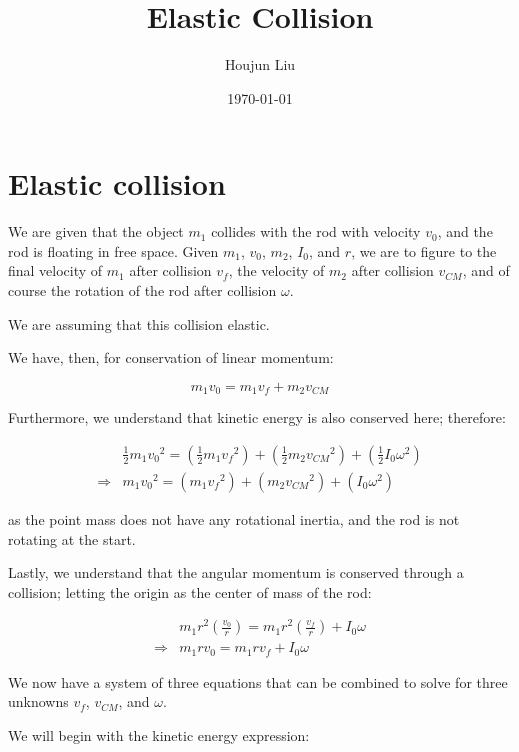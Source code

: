 \documentclass[letterpaper]{article}
\author{Houjun Liu}
\date{\today}
\title{Elastic Collision}
\renewcommand{\tableofcontents}{}
\renewcommand\maketitle{}
\begin{document}
\maketitle
\tableofcontents


\section{Elastic collision}
\label{sec:org0e469a7}
We are given that the object \(m_1\) collides with the rod with velocity \(v_0\), and the rod is floating in free space. Given \(m_1\), \(v_0\), \(m_2\), \(I_0\), and \(r\), we are to figure to the final velocity of \(m_1\) after collision \(v_f\), the velocity of \(m_2\) after collision \(v_{CM}\), and of course the rotation of the rod after collision \(\omega\).

We are assuming that this collision elastic.

We have, then, for conservation of linear momentum:

\begin{equation}
 m_1 v_0 = m_1v_f + m_2 v_{CM} 
\end{equation}

Furthermore, we understand that kinetic energy is also conserved here; therefore:

\begin{align}
&\frac{1}{2} m_1{v_0}^2 = \left(\frac{1}{2} m_1{v_f}^2\right)+\left(\frac{1}{2} m_2{v_{CM}}^2\right)+\left(\frac{1}{2} I_0{\omega}^2\right)\\
\Rightarrow & m_1{v_0}^2 = \left( m_1{v_f}^2\right)+\left( m_2{v_{CM}}^2\right)+\left( I_0{\omega}^2\right)
\end{align}

as the point mass does not have any rotational inertia, and the rod is not rotating at the start.

Lastly, we understand that the angular momentum is conserved through a collision; letting the origin as the center of mass of the rod:

\begin{align}
   &m_1 r^2 \left(\frac{v_0}{r}\right) = m_1 r^2 \left(\frac{v_f}{r}\right) + I_0 \omega\\
\Rightarrow &m_1 r v_0 = m_1 r v_f + I_0 \omega
\end{align}

We now have a system of three equations that can be combined to solve for three unknowns \(v_f\), \(v_{CM}\), and \(\omega\).

We will begin with the kinetic energy expression:
\end{document}
